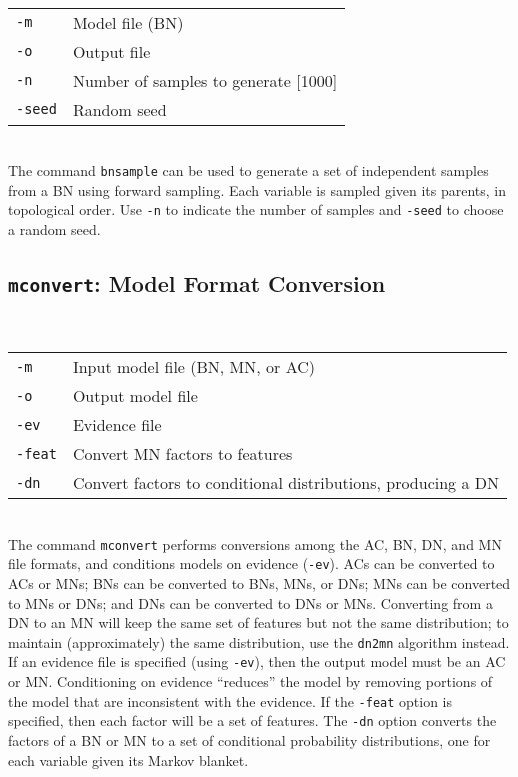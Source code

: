\documentclass[11pt]{article}
\begin{document}

\noindent {} \\
\begin{tabular}{ll}
{\tt -m} &      Model file (BN) \\
{\tt -o} &      Output file \\
{\tt -n} &      Number of samples to generate [1000] \\
{\tt -seed} &   Random seed \\
\end{tabular} \\

The command {\tt bnsample} can be used to generate a set of
independent samples from a BN using forward sampling.  Each variable
is sampled given its parents, in topological order.  Use {\tt -n} to
indicate the number of samples and {\tt -seed} to choose a random
seed.

\subsection{{\tt mconvert}: Model Format Conversion} \label{sec:mconvert}


\noindent {} \\
\begin{tabular}{ll}
{\tt -m} &      Input model file (BN, MN, or AC) \\
{\tt -o} &      Output model file \\
{\tt -ev} &     Evidence file \\
{\tt -feat} &   Convert MN factors to features \\
{\tt -dn} &     Convert factors to conditional distributions, producing a DN \\
\end{tabular} \\

The command {\tt mconvert} performs conversions among the AC, BN, DN,
and MN file formats, and conditions models on evidence ({\tt -ev}).
ACs can be converted to ACs or MNs; BNs can be converted to BNs, MNs,
or DNs; MNs can be converted to MNs or DNs; and DNs can be converted
to DNs or MNs.  Converting from a DN to an MN will keep the same set
of features but not the same distribution; to maintain (approximately)
the same distribution, use the {\tt dn2mn} algorithm instead.  If an
evidence file is specified (using {\tt -ev}), then the output model
must be an AC or MN.  Conditioning on evidence ``reduces'' the model
by removing portions of the model that are inconsistent with the
evidence.  If the {\tt -feat} option is specified, then each factor
will be a set of features.  The {\tt -dn} option converts the factors
of a BN or MN to a set of conditional probability distributions, one
for each variable given its Markov blanket.
\end{document}
